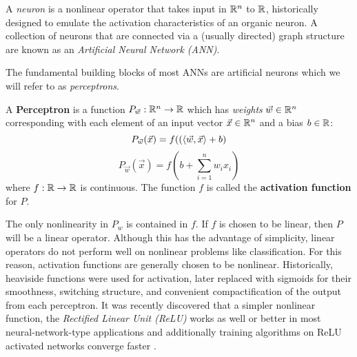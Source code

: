 A \emph{neuron} is a nonlinear operator that takes input in $\mathbb{R}^n$ to $\mathbb{R}$, historically designed to emulate the activation characteristics of an organic neuron. A collection of neurons that are connected via a (usually directed) graph structure are known as an \emph{Artificial Neural Network (ANN)}. 

The fundamental building blocks of most ANNs are artificial neurons which we will refer to as \emph{perceptrons}.

\begin{definition}{A \textbf{Perceptron} is  }
\label{perceptron}
a function $P_{\vec w}: \mathbb{R}^n \to \mathbb{R}$ which has \emph{weights} $\vec
w \in \mathbb{R}^n$ corresponding with each element of an input vector $\vec
x\in \mathbb{R}^n$ and a bias $b \in \mathbb{R}$:
\[P_{\vec w}(\vec x) = f(\left(\left\langle \vec w,\vec x \right\rangle + b\right)\]
\[P_{\vec w}(\vec x) = f\left(b + \sum_{i = 1}^n w_i x_i\right)\]
where $f: \mathbb{R} \to \mathbb{R}$ is continuous. The function $f$ is called the \textbf{activation function} for $P$. 
\end{definition}


The only nonlinearity in $P_w$ is contained in $f$. If $f$ is chosen to be linear, then $P$ will be a linear operator. Although this has the advantage of simplicity, linear operators do not perform well on nonlinear problems like classification. For this reason, activation functions are generally chosen to be nonlinear. Historically, heaviside functions were used for activation, later replaced with sigmoids \cite{malik1990preattentive} for their smoothness, switching structure, and convenient
compactification of the output from each perceptron.  It was recently discovered that a simpler nonlinear function, the \emph{Rectified Linear Unit (ReLU)} works as well or better in most neural-network-type applications \cite{glorot2011deep} and additionally training algorithms on ReLU activated networks converge faster \cite{nair_rectified_nodate}. 


